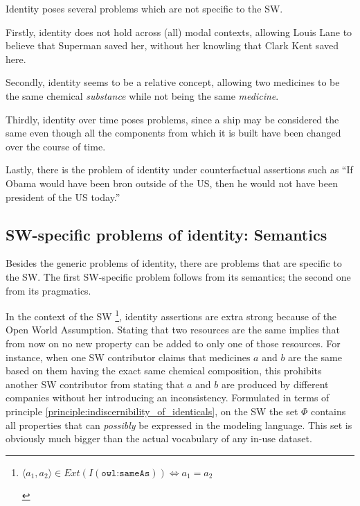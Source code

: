 Identity poses several problems which are not specific to the SW.

Firstly, identity does not hold across (all) modal contexts,
  allowing Louis Lane to believe that Superman saved her,
  without her knowling that Clark Kent saved here.

Secondly, identity seems to be a relative concept\cite{Geach},
  allowing two medicines to be the same chemical \emph{substance}
  while not being the same \emph{medicine}.

Thirdly, identity over time poses problems,
  since a ship may be considered the same
  even though all the components from which it is built
  have been changed over the course of time.\cite{}

Lastly, there is the problem of identity under counterfactual assertions
  such as ``If Obama would have been bron outside of the US,
  then he would not have been president of the US today.''\cite{Kripke1980}

\subsection{SW-specific problems of identity: Semantics}

Besides the generic problems of identity,
  there are problems that are specific to the SW.
The first SW-specific problem follows from its semantics;
  the second one from its pragmatics.

In the context of the SW
  \footnote{
    \begin{definition}
    \label{def:owl_sameAs}
    $\langle a_1, a_2 \rangle \in Ext(I(\texttt{owl:sameAs})) \iff a_1 = a_2$
    \end{definition}
  },
  identity assertions are extra strong
  because of the Open World Assumption.
Stating that two resources are the same
  implies that from now on no new property can be added
  to only one of those resources.
For instance, when one SW contributor claims that
  medicines $a$ and $b$ are the same
  based on them having the exact same chemical composition,
  this prohibits another SW contributor from stating that
  $a$ and $b$ are produced by different companies
  without her introducing an inconsistency.
Formulated in terms of
  principle \ref{principle:indiscernibility_of_identicals},
  on the SW the set $\Phi$ contains
  all properties that can \emph{possibly} be expressed
  in the modeling language.
This set is obviously much bigger than the actual vocabulary
  of any in-use dataset.

